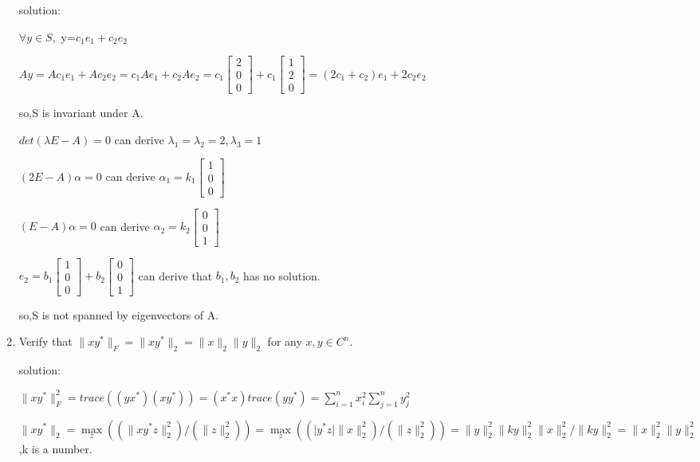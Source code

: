 \documentclass{article}
\begin{document}
\begin{enumerate}
		solution:$ $
		
		$\forall y\in S,$ y=$c_1 e_1 +c_2 e_2$
		
		$Ay=A c_1 e_1 +A c_2 e_2=c_1 A e_1 +c_2 A e_2
		=c_1 \begin{bmatrix} 2\\0\\0  \end{bmatrix}
		+c_1 \begin{bmatrix} 1\\2\\0  \end{bmatrix}
		=(2c_1+c_2)e_1+2c_2 e_2$
		
		so,S is invariant under A.
		
		$det(\lambda E-A)=0$ can derive $\lambda _1=\lambda _2 =2,\lambda _3=1$
		
		$(2E-A)\alpha =0$ can derive $\alpha _1=k_1\begin{bmatrix} 1\\0\\0  \end{bmatrix} $
		
		$(E-A)\alpha =0$ can derive $\alpha _2=k_2\begin{bmatrix} 0\\0\\1  \end{bmatrix} $
		
		$e_2=b_1 \begin{bmatrix} 1\\0\\0  \end{bmatrix} +b_2 \begin{bmatrix} 0\\0\\1  \end{bmatrix} $ can derive that $b_1,b_2$ has no solution.
		
		so,S is not spanned by eigenvectors of A.
		
		\item%
		Verify that $\parallel xy^*\parallel_F = \parallel xy^* \parallel_2 = \parallel x \parallel_2 \parallel y \parallel_2$ for any $x, y \in C^n$.
		
		solution:$ $
		
		$\parallel xy^*\parallel ^2_F =trace((yx^*)(xy^*))
		=(x^*x)trace(yy^*)=\sum_{i=1}^n{x_{i}^2}\sum_{j=1}^n{y_{j}^2}$
		
		$\parallel xy^*\parallel _2
		=\max \limits_{z}((\parallel xy^*z\parallel _2^2)/(\parallel z\parallel _2^2))
		=\max \limits_{z}((\lvert y^*z \rvert \parallel x\parallel _2^2)/(\parallel z\parallel _2^2))
		=\parallel y\parallel _2^2\parallel ky\parallel _2^2\parallel x\parallel _2^2/\parallel ky\parallel _2^2=\parallel x\parallel _2^2 \parallel y\parallel _2^2$,k is a number.
		

\end{enumerate}
\end{document}

